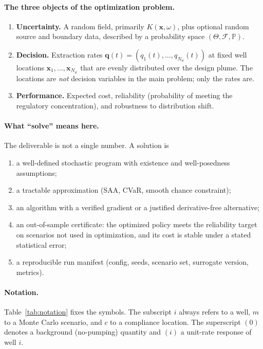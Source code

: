 \documentclass[11pt]{article}
\numberwithin{equation}{section}
\newcommand{\Prob}{\mathbb{P}}
\newcommand{\xx}{\mathbf{x}}
\theoremstyle{plain}
\begin{document}
\paragraph{The three objects of the optimization problem.}
\begin{enumerate}[leftmargin=1.6em,itemsep=2pt]
  \item \textbf{Uncertainty.}  A random field, primarily
        $K(\xx,\omega)$, plus optional random source and boundary data,
        described by a probability space $(\Theta,\mathcal{F},\Prob)$.
  \item \textbf{Decision.}  Extraction rates
        $\mathbf{q}(t)=(q_1(t),\dots,q_{N_w}(t))$ at fixed well locations
        $\xx_1,\dots,\xx_{N_w}$ that are evenly distributed over the design
        plume.  The locations are \emph{not} decision variables in the main
        problem; only the rates are.
  \item \textbf{Performance.}  Expected cost, reliability (probability of
        meeting the regulatory concentration), and robustness to distribution
        shift.
\end{enumerate}

\paragraph{What ``solve'' means here.}
The deliverable is not a single number.  A solution is
\begin{enumerate}[leftmargin=1.6em,itemsep=2pt]
  \item a well-defined stochastic program with existence and well-posedness
        assumptions;
  \item a tractable approximation (SAA, CVaR, smooth chance constraint);
  \item an algorithm with a verified gradient or a justified derivative-free
        alternative;
  \item an out-of-sample certificate: the optimized policy meets the
        reliability target on scenarios not used in optimization, and its
        cost is stable under a stated statistical error;
  \item a reproducible run manifest (config, seeds, scenario set, surrogate
        version, metrics).
\end{enumerate}

\paragraph{Notation.}
Table~\ref{tab:notation} fixes the symbols.  The subscript $i$ always refers
to a well, $m$ to a Monte Carlo scenario, and $c$ to a compliance location.
The superscript $(0)$ denotes a background (no-pumping) quantity and $(i)$ a
unit-rate response of well $i$.
\end{document}
